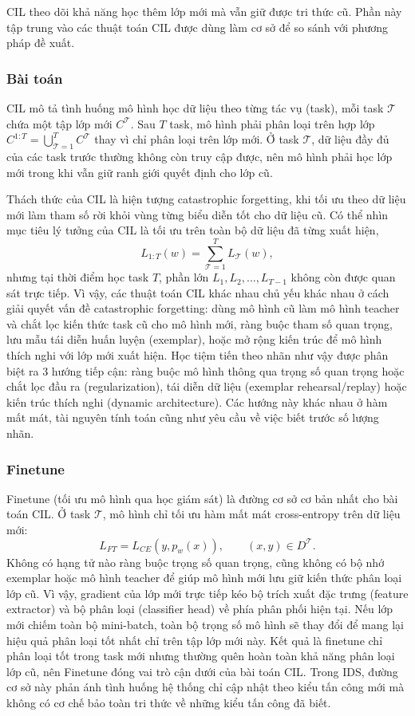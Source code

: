 CIL theo dõi khả năng học thêm lớp mới mà vẫn giữ được tri thức cũ. Phần này tập trung vào các thuật toán CIL được dùng làm cơ sở để so sánh với phương pháp đề xuất.

\subsubsection{Bài toán}

CIL mô tả tình huống mô hình học dữ liệu theo từng tác vụ (task), mỗi task $\mathcal{T}$ chứa một tập lớp mới $C^{\mathcal{T}}$. Sau $T$ task, mô hình phải phân loại trên hợp lớp $C^{1:T}=\bigcup_{\mathcal{T}=1}^{T}C^{\mathcal{T}}$ thay vì chỉ phân loại trên lớp mới. Ở task $\mathcal{T}$, dữ liệu đầy đủ của các task trước thường không còn truy cập được, nên mô hình phải học lớp mới trong khi vẫn giữ ranh giới quyết định cho lớp cũ.

Thách thức của CIL là hiện tượng catastrophic forgetting, khi tối ưu theo dữ liệu mới làm tham số rời khỏi vùng từng biểu diễn tốt cho dữ liệu cũ. Có thể nhìn mục tiêu lý tưởng của CIL là tối ưu trên toàn bộ dữ liệu đã từng xuất hiện,
$$
L_{1:T}(w)=\sum_{\mathcal{T}=1}^{T}L_{\mathcal{T}}(w),
$$
nhưng tại thời điểm học task $T$, phần lớn $L_1, L_2, \ldots, L_{T-1}$ không còn được quan sát trực tiếp. Vì vậy, các thuật toán CIL khác nhau chủ yếu khác nhau ở cách giải quyết vấn đề catastrophic forgetting: dùng mô hình cũ làm mô hình teacher và chắt lọc kiến thức task cũ cho mô hình mới, ràng buộc tham số quan trọng, lưu mẫu tái diễn huấn luyện (exemplar), hoặc mở rộng kiến trúc để mô hình thích nghi với lớp mới xuất hiện. Học tiệm tiến theo nhãn như vậy được phân biệt ra $3$ hướng tiếp cận: ràng buộc mô hình thông qua trọng số quan trọng hoặc chắt lọc đầu ra (regularization), tái diễn dữ liệu (exemplar rehearsal/replay) hoặc kiến trúc thích nghi (dynamic architecture). Các hướng này khác nhau ở hàm mất mát, tài nguyên tính toán cũng như yêu cầu về việc biết trước số lượng nhãn.

\subsubsection{Finetune}

Finetune (tối ưu mô hình qua học giám sát) là đường cơ sở cơ bản nhất cho bài toán CIL. Ở task $\mathcal{T}$, mô hình chỉ tối ưu hàm mất mát cross-entropy trên dữ liệu mới:
$$
L_{FT}=L_{CE}(y,p_w(x)),\qquad (x,y)\in D^{\mathcal{T}}.
$$
Không có hạng tử nào ràng buộc trọng số quan trọng, cũng không có bộ nhớ exemplar hoặc mô hình teacher để giúp mô hình mới lưu giữ kiến thức phân loại lớp cũ. Vì vậy, gradient của lớp mới trực tiếp kéo bộ trích xuất đặc trưng (feature extractor) và bộ phân loại (classifier head) về phía phân phối hiện tại. Nếu lớp mới chiếm toàn bộ mini-batch, toàn bộ trọng số mô hình sẽ thay đổi để mang lại hiệu quả phân loại tốt nhất chỉ trên tập lớp mới này. Kết quả là finetune chỉ phân loại tốt trong task mới nhưng thường quên hoàn toàn khả năng phân loại lớp cũ, nên Finetune đóng vai trò cận dưới của bài toán CIL. Trong IDS, đường cơ sở này phản ánh tình huống hệ thống chỉ cập nhật theo kiểu tấn công mới mà không có cơ chế bảo toàn tri thức về những kiểu tấn công đã biết.

